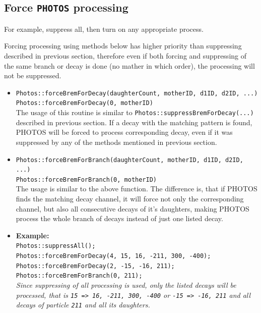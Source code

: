 \documentclass[]{Photos_interface_design}
\begin{document}
\subsection{Force {\tt PHOTOS} processing }
\label{section:force}

For example, suppress all, then turn on any appropriate process.

Forcing processing using methods below has higher priority than suppressing described
in previous section, therefore even if both forcing and suppressing of the same
branch or decay is done (no mather in which order), the processing will not be
suppressed.

\begin{itemize}

 \item {\tt Photos::forceBremForDecay(daughterCount, motherID, d1ID, d2ID, ...)} \hfill \\
       {\tt Photos::forceBremForDecay(0, motherID)} \hfill \\
       The usage of this routine is similar to {\tt Photos::suppressBremForDecay(...)}
	   described in previous section. If a decay with the matching pattern is found,
	   PHOTOS will be forced to process corresponding decay, even if it was suppressed
	   by any of the methods mentioned in previous section.
 \item {\tt Photos::forceBremForBranch(daughterCount, motherID, d1ID, d2ID, ...)} \hfill \\
       {\tt Photos::forceBremForBranch(0, motherID)} \hfill \\
       The usage is similar to the above function. The difference is,
	   that if PHOTOS finds the matching decay channel, it will force not only the corresponding channel,
	   but also all consecutive decays of it's daughters, making PHOTOS process the whole branch
	   of decays instead of just one listed decay.
 \item \textbf{Example:} \hfill \\
{\tt Photos::suppressAll(); } \\
{\tt Photos::forceBremForDecay(4, 15, 16, -211, 300, -400); } \\
{\tt Photos::forceBremForDecay(2, -15, -16, 211); } \\
{\tt Photos::forceBremForBranch(0, 211); } \\
\emph{Since suppressing of all processing is used, only the listed decays will be processed, that is
{\tt 15 => 16, -211, 300, -400} or {\tt -15 => -16, 211} and all decays of particle {\tt 211} and
all its daughters.}
\end{itemize}
\end{document}
